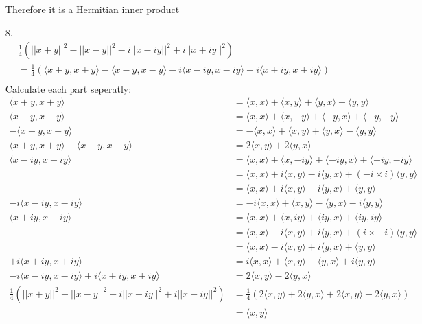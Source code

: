 \documentclass{article}
\begin{document}
\begin{itemize}
    Therefore it is a Hermitian inner product
    \item[8.]
    \begin{align*}
        &\frac{1}{4}\left(||x+y||^2-||x-y||^2-i||x-iy||^2+i||x+iy||^2\right) \\
        &=\frac{1}{4}\left(\langle x+y,x+y\rangle-\langle x-y,x-y\rangle-i\langle x-iy,x-iy\rangle+i\langle x+iy,x+iy\rangle\right)\\
    \end{align*}
    Calculate each part seperatly:
    \begin{align*}
        \langle x+y,x+y\rangle &= \langle x,x\rangle+\langle x,y\rangle+\langle y,x \rangle+\langle y,y \rangle\\
        \langle x-y,x-y\rangle &= \langle x,x\rangle+\langle x,-y\rangle+\langle -y,x\rangle+\langle -y,-y\rangle\\
        -\langle x-y,x-y\rangle &= -\langle x,x\rangle+\langle x,y\rangle+\langle y,x\rangle-\langle y,y\rangle\\
        \langle x+y,x+y\rangle -\langle x-y,x-y\rangle &=2\langle x,y\rangle+2\langle y,x\rangle\\
        \langle x-iy,x-iy\rangle &= \langle x,x\rangle+\langle x,-iy\rangle + \langle -iy,x\rangle+\langle -iy,-iy\rangle\\
        &=\langle x,x\rangle+i\langle x,y\rangle -i \langle y,x\rangle+(-i\times i)\langle y,y\rangle\\
        &=\langle x,x\rangle+i\langle x,y\rangle -i \langle y,x\rangle+\langle y,y\rangle\\
        -i\langle x-iy,x-iy\rangle&=-i\langle x,x\rangle+\langle x,y\rangle - \langle y,x\rangle-i\langle y,y\rangle\\
        \langle x+iy,x+iy\rangle&= \langle x,x\rangle+\langle x,iy\rangle + \langle iy,x\rangle+\langle iy,iy\rangle\\
        &=\langle x,x\rangle-i\langle x,y\rangle+i\langle y,x\rangle+(i\times -i)\langle y,y\rangle\\
        &=\langle x,x\rangle-i\langle x,y\rangle+i\langle y,x\rangle+\langle y,y\rangle\\
        +i\langle x+iy,x+iy\rangle&=i\langle x,x\rangle+\langle x,y\rangle-\langle y,x\rangle+i\langle y,y\rangle\\
        -i\langle x-iy,x-iy\rangle+i\langle x+iy,x+iy\rangle&=2\langle x,y\rangle-2\langle y,x\rangle\\
        \frac{1}{4}\left(||x+y||^2-||x-y||^2-i||x-iy||^2+i||x+iy||^2\right)&=\frac{1}{4}(2\langle x,y\rangle+2\langle y,x\rangle+2\langle x,y\rangle-2\langle y,x\rangle)\\
        &= \langle x,y \rangle
    \end{align*}
    
\end{itemize}
\end{document}
